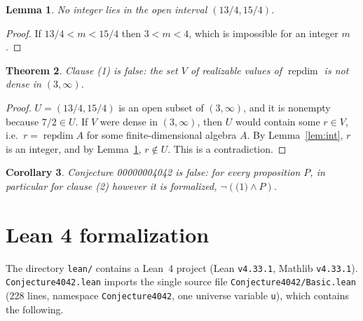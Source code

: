 \documentclass[11pt]{article}
\newtheorem{theorem}{Theorem}
\newtheorem{lemma}[theorem]{Lemma}
\newtheorem{corollary}[theorem]{Corollary}
\theoremstyle{definition}
\theoremstyle{remark}
\renewcommand{\_}{\oldus\allowbreak}
\newcommand{\repdim}{\operatorname{repdim}}
\begin{document}
\begin{lemma}\label{lem:gap}
No integer lies in the open interval $(13/4, 15/4)$.
\end{lemma}

\begin{proof}
If $13/4 < m < 15/4$ then $3 < m < 4$, which is impossible for an integer $m$.
\end{proof}

\begin{theorem}\label{thm:main}
Clause (1) is false: the set $V$ of realizable values of $\repdim$ is not dense in $(3,\infty)$.
\end{theorem}

\begin{proof}
$U = (13/4, 15/4)$ is an open subset of $(3,\infty)$, and it is nonempty because $7/2 \in U$. If $V$ were
dense in $(3,\infty)$, then $U$ would contain some $r \in V$, i.e.\ $r = \repdim A$ for some
finite-dimensional algebra $A$. By Lemma~\ref{lem:int}, $r$ is an integer, and by Lemma~\ref{lem:gap},
$r \notin U$. This is a contradiction.
\end{proof}

\begin{corollary}
Conjecture 00000004042 is false: for every proposition $P$, in particular for clause (2) however it is
formalized, $\neg(\text{(1)} \wedge P)$.
\end{corollary}

\section{Lean 4 formalization}\label{sec:lean}

The directory \texttt{lean/} contains a Lean~4 project (Lean \texttt{v4.33.1}, Mathlib \texttt{v4.33.1}).
\texttt{Conjecture4042.lean} imports the single source file \texttt{Conjecture4042/Basic.lean}
(228 lines, namespace \texttt{Conjecture4042}, one universe variable \texttt{u}), which contains the
following.
\end{document}
